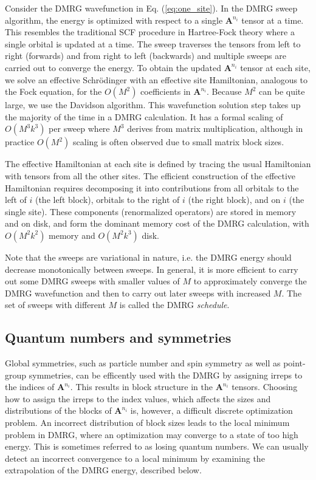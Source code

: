 \documentclass[letterpaper,12pt,aps, pra]{revtex4-1}
\begin{document}
Consider the DMRG wavefunction in Eq. (\ref{eq:one_site}).
In the DMRG sweep algorithm,
the energy is optimized with respect to a single $\mathbf{A}^{n_i}$ tensor at a time. This resembles
 the traditional SCF procedure in  Hartree-Fock theory where a single orbital is updated at a time.
The sweep traverses the tensors from left to right (forwards) and from right to left (backwards)
and multiple sweeps are carried out to converge the energy. To obtain the updated $\mathbf{A}^{n_i}$ tensor at each
site, we solve an effective Schr\"odinger with an effective site Hamiltonian, analogous to the Fock equation, for the $O(M^2)$ coefficients in $\mathbf{A}^{n_i}$. 
Because
$M^2$ can be quite large, we use the Davidson algorithm.  This wavefunction solution step
takes up the majority of the time in a DMRG calculation. It  has a formal scaling of $O(M^3 k^3)$ per sweep where $M^3$ derives
from matrix multiplication, although in practice $O(M^2)$ scaling is often observed due to  small matrix block sizes.

The effective Hamiltonian at each site is defined by tracing the usual Hamiltonian with
 tensors from all the other  sites. The efficient construction of the effective Hamiltonian requires
decomposing it into contributions from all orbitals to the left of $i$ (the left block), orbitals to the right of $i$ (the right block),
and on $i$ (the single site). These components (renormalized operators) are stored in memory and on disk,
and form the dominant memory cost of the DMRG calculation, with $O(M^2 k^2)$ memory and $O(M^2 k^3)$ disk. 

Note that the sweeps are variational in nature, i.e. the DMRG energy should decrease monotonically between sweeps.
In general, it is more efficient to carry out some DMRG sweeps with smaller values of $M$ to approximately
converge the DMRG wavefunction and then to carry out later sweeps with increased $M$. The set of sweeps with different $M$ is
called the DMRG {\it schedule}.

\subsection{Quantum numbers and symmetries} \label{sec:convergence1}

Global symmetries, such as particle number and spin symmetry as well as
point-group symmetries, can be efficently used with the DMRG by assigning irreps
to the indices of $\mathbf{A}^{n_i}$. This results in block
structure in the $\mathbf{A}^{n_i}$ tensors. Choosing how to assign the irreps
to the index values, which affects the sizes and distributions of the blocks of $\mathbf{A}^{n_i}$
is, however,  a difficult  discrete optimization problem. An incorrect distribution 
of block sizes leads to the local minimum problem in DMRG, where an optimization may converge to a state
of too high energy. This is sometimes referred to as losing quantum numbers. 
We can usually detect an incorrect
convergence to a local minimum by examining the extrapolation of the DMRG energy, described below.
\end{document}
